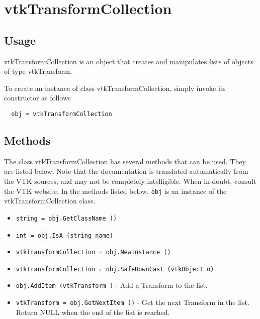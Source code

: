 \section{vtkTransformCollection}

\subsection{Usage}

 vtkTransformCollection is an object that creates and manipulates lists of
 objects of type vtkTransform.

To create an instance of class vtkTransformCollection, simply
invoke its constructor as follows
\begin{verbatim}
  obj = vtkTransformCollection
\end{verbatim}
\subsection{Methods}

The class vtkTransformCollection has several methods that can be used.
  They are listed below.
Note that the documentation is translated automatically from the VTK sources,
and may not be completely intelligible.  When in doubt, consult the VTK website.
In the methods listed below, \verb|obj| is an instance of the vtkTransformCollection class.
\begin{itemize}
\item  \verb|string = obj.GetClassName ()|

\item  \verb|int = obj.IsA (string name)|

\item  \verb|vtkTransformCollection = obj.NewInstance ()|

\item  \verb|vtkTransformCollection = obj.SafeDownCast (vtkObject o)|

\item  \verb|obj.AddItem (vtkTransform )| -  Add a Transform to the list.

\item  \verb|vtkTransform = obj.GetNextItem ()| -  Get the next Transform in the list. Return NULL when the end of the
 list is reached.

\end{itemize}
